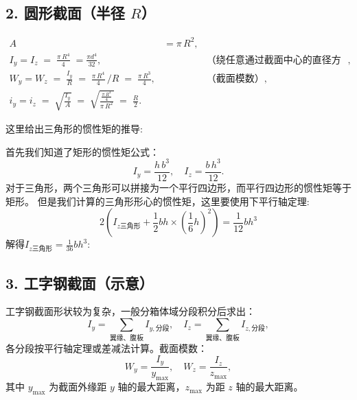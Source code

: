 \documentclass[12pt,a4paper]{article}
\begin{document}
\subsection*{2. 圆形截面（半径 $R$）}
\begin{align}
  A &= \pi\,R^2, \\[6pt]
  I_y = I_z \;=\; \frac{\pi\,R^4}{4} \; = \frac{\pi d^4}{32}, 
    &\quad &\text{（绕任意通过截面中心的直径方向）},\\[6pt]
  W_y = W_z \;=\; \frac{I_y}{R} 
    \;=\; \frac{\pi\,R^4}{4}\,\Big/R 
    \;=\; \frac{\pi\,R^3}{4}, 
    &\quad &\text{（截面模数）},\\[6pt]
  i_y = i_z \;=\; \sqrt{\frac{I_y}{A}} 
    \;=\; \sqrt{\frac{\tfrac{\pi\,R^4}{4}}{\pi\,R^2}} 
    \;=\; \frac{R}{2}.
\end{align}

这里给出三角形的惯性矩的推导:

\begin{figure}[H]
\centering
{}
\end{figure}


首先我们知道了矩形的惯性矩公式：
$$
I_y = \frac{h\,b^3}{12}, \quad I_z = \frac{b\,h^3}{12}.
$$
对于三角形，两个三角形可以拼接为一个平行四边形，而平行四边形的惯性矩等于矩形。
但是我们计算的三角形形心的惯性矩，这里要使用下平行轴定理:
$$2(I_{z\text{三角形}}+\frac{1}{2}bh\times (\frac{1}{6}h)^2)=\frac{1}{12}bh^3$$
解得$I_{z\text{三角形}}=\frac{1}{36}bh^3$:
\subsection*{3. 工字钢截面（示意）}
工字钢截面形状较为复杂，一般分箱体域分段积分后求出：
\[
  I_y = \sum\limits_{\text{翼缘、腹板}} I_{y,\text{分段}}, 
  \quad
  I_z = \sum\limits_{\text{翼缘、腹板}} I_{z,\text{分段}},
\]
各分段按平行轴定理或差减法计算。截面模数：
\[
  W_y = \frac{I_y}{y_{\max}}, 
  \quad
  W_z = \frac{I_z}{z_{\max}},
\]
其中 $y_{\max}$ 为截面外缘距 $y$ 轴的最大距离，$z_{\max}$ 为距 $z$ 轴的最大距离。
\end{document}
